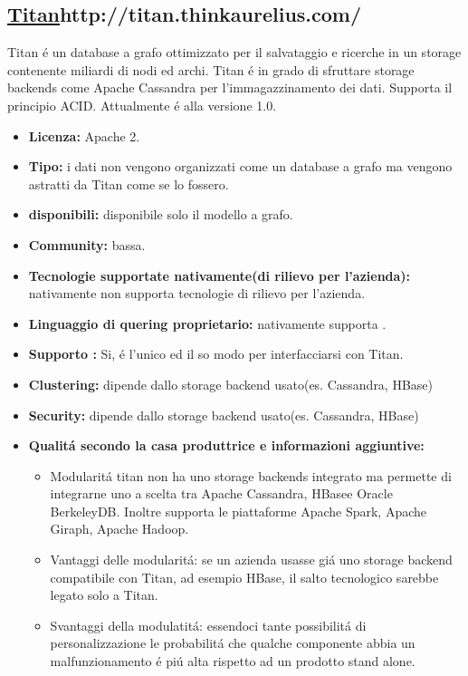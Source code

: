 \subsection{\url{Titan}{http://titan.thinkaurelius.com/}}
Titan \'e un database a grafo ottimizzato per il salvataggio e ricerche in un storage contenente miliardi di nodi ed archi. Titan \'e in grado di sfruttare storage backends come Apache Cassandra per l'immagazzinamento dei dati. Supporta il principio ACID.
Attualmente \'e alla versione 1.0.
\begin{itemize}
\item \textbf{Licenza:} Apache 2.
\item \textbf{Tipo:} i dati non vengono organizzati come un database a grafo  ma vengono astratti da Titan come se lo fossero.
\item \textbf{ disponibili:} disponibile solo il modello a grafo.
\item \textbf{Community:} bassa.
\item \textbf{Tecnologie supportate nativamente(di rilievo per l'azienda):} nativamente non supporta tecnologie di rilievo per l'azienda.
\item\textbf{Linguaggio di quering proprietario:} nativamente supporta .
\item\textbf{Supporto :} Si, \'e l'unico ed il so modo per interfacciarsi con Titan.

\item\textbf{Clustering:} dipende dallo storage backend usato(es. Cassandra, HBase)
\item\textbf{Security:}  dipende dallo storage backend usato(es. Cassandra, HBase)
\item\textbf{Qualit\'a secondo la casa produttrice e informazioni aggiuntive:} 
\begin{itemize}
\item{Modularit\'a} titan non ha uno storage backends integrato ma permette di integrarne uno a scelta tra Apache Cassandra, HBasee Oracle BerkeleyDB. Inoltre supporta le piattaforme Apache Spark, Apache Giraph, Apache Hadoop.
\item{Vantaggi delle modularit\'a:} se un azienda usasse gi\'a uno storage backend compatibile con Titan, ad esempio HBase, il salto tecnologico sarebbe legato solo a Titan.
\item{Svantaggi della modulatit\'a:} essendoci tante possibilit\'a di personalizzazione le probabilit\'a che qualche componente abbia un malfunzionamento \'e pi\'u alta rispetto ad un prodotto stand alone. 

\end{itemize}
\end{itemize}








